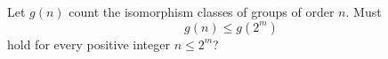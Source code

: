 Let $g(n)$ count the isomorphism classes of groups of order $n$. Must
\[
g(n)\leq g(2^m)
\]
hold for every positive integer $n\leq2^m$?
